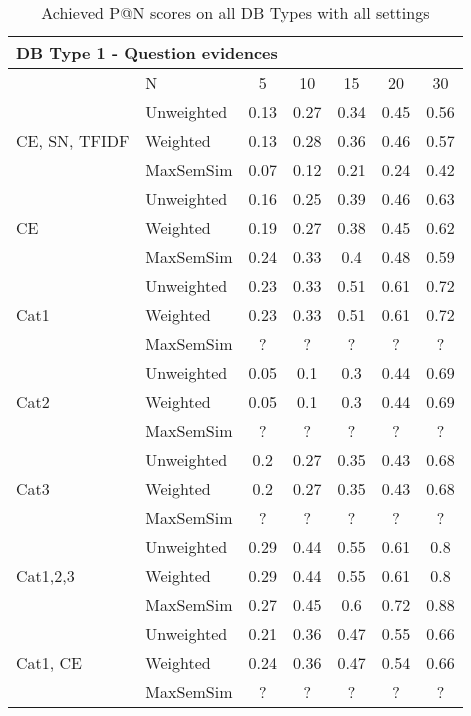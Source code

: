\documentclass[conference]{IEEEtran}
\begin{document}
\begin{table*}[!h]
	\centering
	\renewcommand{\arraystretch}{1.3}
	\caption{Achieved P@N scores on all DB Types with all settings}
	\label{tab:resultsmrr1}
	\begin{tabular}{l||l|ccccc}\hline
	
		\multicolumn{7}{l}{DB Type 1 - Question evidences}\\\hline\hline
		& N & 5 & 10 & 15 & 20 & 30\\\hline
		
		\multirow{3}{*}{CE, SN, TFIDF} & 
		 Unweighted & 0.13 & 0.27 & 0.34 & 0.45 & 0.56\\
		 & Weighted & 0.13 & 0.28 & 0.36 & 0.46 & 0.57\\
		 & MaxSemSim & 0.07 & 0.12 & 0.21 & 0.24 & 0.42\\
		 
		\multirow{3}{*}{CE} & Unweighted & 0.16 & 0.25 & 0.39 & 0.46 & 0.63\\
		 & Weighted & 0.19 & 0.27 & 0.38 & 0.45 & 0.62\\
		 & MaxSemSim & 0.24 & 0.33 & 0.4 & 0.48 & 0.59\\ 
		\hline
		
		\multirow{3}{*}{Cat1} & Unweighted & 0.23 & 0.33 & 0.51 & 0.61 & 0.72\\
		 & Weighted & 0.23 & 0.33 & 0.51 & 0.61 & 0.72\\
		 & MaxSemSim & ? & ? & ? & ? & ?\\ 
		\hline
		
		\multirow{3}{*}{Cat2} & Unweighted & 0.05 & 0.1 & 0.3 & 0.44 & 0.69\\
		 & Weighted & 0.05 & 0.1 & 0.3 & 0.44 & 0.69\\
		 & MaxSemSim & ? & ? & ? & ? & ?\\ 
		\hline
		
		\multirow{3}{*}{Cat3} & Unweighted & 0.2 & 0.27 & 0.35 & 0.43 & 0.68\\
		 & Weighted & 0.2 & 0.27 & 0.35 & 0.43 & 0.68\\
		 & MaxSemSim & ? & ? & ? & ? & ?\\ 
		\hline
		
		\multirow{3}{*}{Cat1,2,3} & Unweighted & 0.29 & 0.44 & 0.55 & 0.61 & 0.8\\
		 & Weighted & 0.29 & 0.44 & 0.55 & 0.61 & 0.8\\
		 & MaxSemSim & 0.27 & 0.45 & 0.6 & 0.72 & 0.88\\ 
		\hline
		
		\multirow{3}{*}{Cat1, CE} & Unweighted & 0.21 & 0.36 & 0.47 & 0.55 & 0.66\\
		 & Weighted & 0.24 & 0.36 & 0.47 & 0.54 & 0.66\\
		 & MaxSemSim & ? & ? & ? & ? & ?\\ 
		\hline
		

\end{tabular}
\end{table*}
\end{document}
